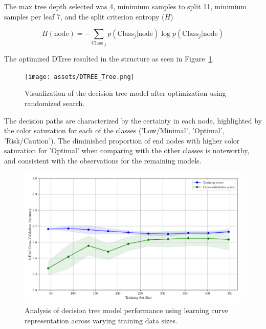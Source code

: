 \documentclass[conference]{IEEEtran}
\begin{document}
The max tree depth selected was 4, minimium samples to split 11, minimium samples per leaf 7, and the split criterion entropy ($H$)

$$H(\text{node}) = - \sum_{\text{Class }_j} p(\text{Class}_j | \text{node}) \log p(\text{Class}_j | \text{node})$$







The optimized DTree resulted in the structure as seen in Figure~\ref{dtree_tree}.

\begin{figure}[H]
    \centering
    \texttt{[image: assets/DTREE\_Tree.png]}
    \caption{Visualization of the decision tree model after optimization using randomized search.}
    \label{dtree_tree}
\end{figure}

The decision paths are characterized by the certainty in each node, highlighted by the color saturation for each of the classes ('Low/Minimal', 'Optimal', 'Risk/Caution'). The diminished proportion of end nodes with higher color saturation for 'Optimal' when comparing with the other classes is noteworthy, and consistent with the observations for the remaining models.

\begin{figure}[H]
    \centering
    \includegraphics[width=1\linewidth]{assets/DTREE_LearningCurve.png}
    \caption{Analysis of decision tree model performance using learning curve representation across varying training data sizes.}
    \label{dtree_lcurve}
\end{figure}
\end{document}
